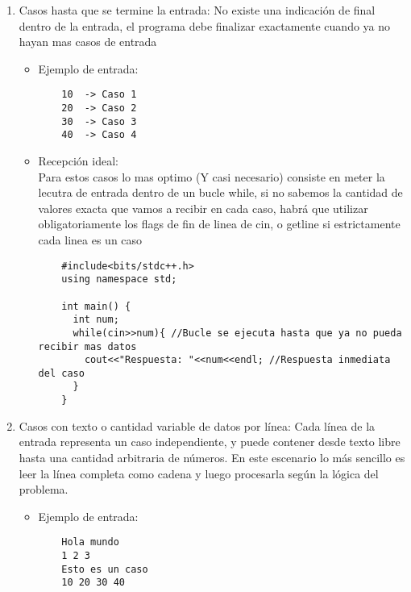 \documentclass[11pt,a4paper]{article}
\begin{document}
\begin{enumerate} [label=\alph*.]
\begin{itemize}
\begin{lstlisting}
    int main() {
      int tamVec;
      while(
        cin>>tamVec //Recepcion dentro del condicional
        && tamVec != 0 //Validacion de las entradas recibidas inmediatamente
      ){
        //Creacion del vector de tamano tamVec con valor inicial 0
        vector<int> values(tamVec, 0); 
        //Recepcion de los elementos del vector
        for(int i = 0; i < tamVec; i++){
          cin>>values[i];
        }
        //Impresion inmediata de la respuesta del caso
        cout<<"[ ";
        for(int value: values){
          cout<<value<<" ";
        }
        cout<<"]"<<endl;
      }
    }
  \end{lstlisting}
  \end{itemize}
  \item Casos hasta que se termine la entrada: No existe una indicación de final dentro de la entrada, el programa debe finalizar exactamente cuando ya no hayan mas casos de entrada
  \begin{itemize}
    \item Ejemplo de entrada:
    \begin{verbatim}
    10  -> Caso 1
    20  -> Caso 2
    30  -> Caso 3
    40  -> Caso 4
    \end{verbatim}
    \item Recepción ideal:\\
          Para estos casos lo mas optimo (Y casi necesario) consiste en meter la lecutra de entrada dentro de un bucle while, si no sabemos la cantidad de valores exacta que vamos a recibir en cada caso, habrá que utilizar obligatoriamente los flags de fin de linea de cin, o getline si estrictamente cada linea es un caso
  \begin{lstlisting}
    #include<bits/stdc++.h>
    using namespace std;

    int main() {
      int num;
      while(cin>>num){ //Bucle se ejecuta hasta que ya no pueda recibir mas datos
        cout<<"Respuesta: "<<num<<endl; //Respuesta inmediata del caso
      }
    }
  \end{lstlisting}
  \end{itemize}
  \item Casos con texto o cantidad variable de datos por línea: Cada línea de la entrada representa un caso independiente, y puede contener desde texto libre hasta una cantidad arbitraria de números. En este escenario lo más sencillo es leer la línea completa como cadena y luego procesarla según la lógica del problema.
  \begin{itemize}
    \item Ejemplo de entrada:
    \begin{verbatim}
    Hola mundo
    1 2 3
    Esto es un caso
    10 20 30 40
    \end{verbatim}


\end{itemize}
\end{enumerate}
\end{document}
